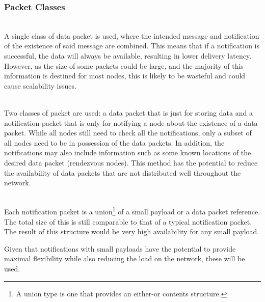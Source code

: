			
			
			
			
			
			
			
			
			
			
			
			
			
			
			
			
			
			
		\subsubsection{Packet Classes}
			\begin{description}[topsep=-5pt,itemsep=-1ex,partopsep=2ex,parsep=1.5ex]
				\item[Data as Notifications] \hfill \\
				A single class of data packet is used, where the intended message and notification of the existence of said message are combined. This means that if a notification is successful, the data will always be available, resulting in lower delivery latency. However, as the size of some packets could be large, and the majority of this information is destined for most nodes, this is likely to be wasteful and could cause scalability issues.
				\item[Notifications Referencing Data] \hfill \\
				Two classes of packet are used: a data packet that is just for storing data and a notification packet that is only for notifying a node about the existence of a data packet. While all nodes still need to check all the notifications, only a subset of all nodes need to be in possession of the data packets. In addition, the notifications may also include information such as some known locations of the desired data packet (rendezvous nodes). This method has the potential to reduce the availability of data packets that are not distributed well throughout the network.
				\item[Notifications with Small Payload] \hfill \\
				Each notification packet is a union\footnote{A union type is one that provides an either-or contents structure.} of a small payload or a data packet reference. The total size of this is still comparable to that of a typical notification packet. The result of this structure would be very high availability for any small payload.
			\end{description}
			Given that notifications with small payloads have the potential to provide maximal flexibility while also reducing the load on the network, these will be used.
			
